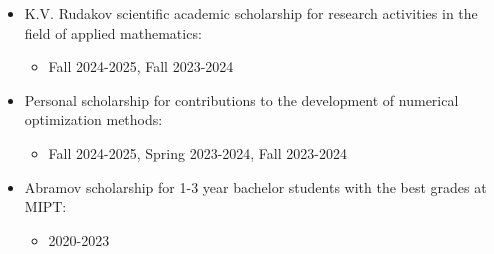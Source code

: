 \documentclass[11pt,a4paper]{moderncv}
\begin{document}
\begin{minipage}[t]{0.62\textwidth}
\begin{itemize}
\item K.V. Rudakov scientific academic scholarship for research activities in the field of applied mathematics:
\begin{itemize}
    \item Fall 2024-2025, Fall 2023-2024
\end{itemize}
\item Personal scholarship for contributions to the development of numerical optimization methods:
\begin{itemize}
    \item Fall 2024-2025, Spring 2023-2024, Fall 2023-2024
\end{itemize}
\item Abramov scholarship for 1-3 year bachelor students with the best grades at MIPT:
\begin{itemize}
    \item 2020-2023
\end{itemize}
\end{itemize}



\end{minipage}
\end{document}
